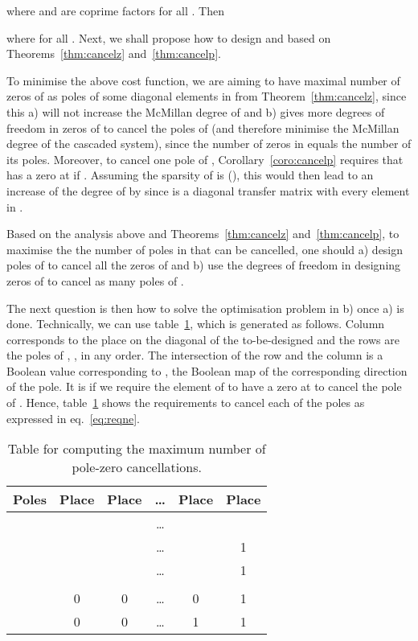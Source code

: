 \documentclass[twocolumn,12pt]{autart}
\theoremstyle{plain}
\begin{document}
where  and  are coprime factors for all . Then 

where  for all . Next, we shall propose how to design  and  based on Theorems~\ref{thm:cancelz} and~\ref{thm:cancelp}.

To minimise the above cost function, we are aiming to have maximal number of zeros of  as poles of some diagonal elements in  from Theorem~\ref{thm:cancelz}, since this a) will not increase the McMillan degree of  and b) gives more degrees of freedom in zeros of  to cancel the poles of  (and therefore minimise the McMillan degree of the cascaded system), since the number of zeros in  equals the number of its poles. Moreover, to cancel one pole  of , Corollary~\ref{coro:cancelp} requires that  has a zero at  if . Assuming the sparsity of  is  (), this would then lead to an increase of the degree of  by  since  is a diagonal transfer matrix with every element in .

Based on the analysis above and Theorems~\ref{thm:cancelz} and~\ref{thm:cancelp}, to maximise the the number of poles in  that can be cancelled, one should a) design poles of  to cancel all the zeros of  and b) use the degrees of freedom in designing zeros of  to cancel as many poles of .

The next question is then how to solve the optimisation problem in b) once a) is done. Technically, we can use table~\ref{table:example}, which is generated as follows. Column  corresponds to the  place on the diagonal of the to-be-designed  and the rows are the poles of ,  , in any order.  The intersection of the  row and the  column is a Boolean value corresponding to , the Boolean map of the corresponding direction of the  pole. It is  if we require the  element of  to have a zero at  to cancel the  pole  of . Hence, table~\ref{table:example} shows the requirements to cancel each of the poles as expressed in eq.~\eqref{eq:reqne}. 
 
\begin{table}[htbp]
 \centering
 \begin{tabular}{|c|c|c|c|c|c|}
   \hline
    Poles & Place & Place &\ldots& Place &  Place  \\ \hline
    &  &  & \ldots &  &  \\ \hline
    &  &  & \ldots&  & 1 \\ \hline
    &  &   & \ldots &  &  1 \\ \hline
    &  &  && & \\ \hline
    & 0& 0&\ldots &0 &1 \\ \hline
    &0   & 0  &\ldots&1 &1  \\ \hline
 \end{tabular}
 \caption{Table for computing the maximum number of pole-zero cancellations.}
  \label{table:example}
\end{table}
\end{document}
